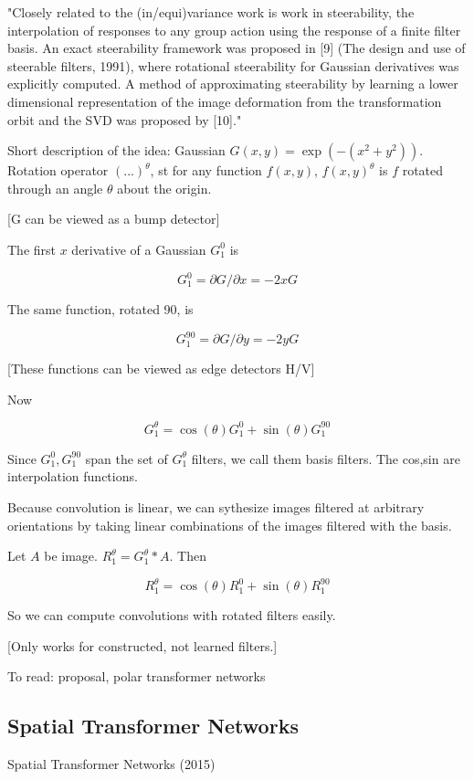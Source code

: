 \documentclass[english]{article}
\begin{document}
\item "Closely related to the (in/equi)variance work is work in steerability, the interpolation of responses to any
group action using the response of a finite filter basis. An exact steerability framework was proposed in [9] (The design and use of steerable filters, 1991),
where rotational steerability for Gaussian derivatives was explicitly computed. A method of approximating steerability by learning a lower dimensional representation of the image deformation from the transformation
orbit and the SVD was proposed by [10]."


Short description of the idea: Gaussian $G(x,y) = \exp(-(x^2+y^2))$. Rotation operator $(...)^\theta$, st for any function $f(x,y)$, $f(x,y)^\theta$ is $f$ rotated through an angle $\theta$ about the origin. 

[G can be viewed as a bump detector]

The first $x$ derivative of a Gaussian $G_1^0$ is 

$$G_1^0 = \partial G/\partial x = -2x G$$

The same function, rotated 90, is 

$$G_1^{90} = \partial G/\partial y = -2y G$$

[These functions can be viewed as edge detectors H/V]

Now 

$$G_1^{\theta} = \cos(\theta) G_1^0 + \sin(\theta) G_1^{90} $$

Since $G_1^0, G_1^{90}$ span the set of $G_1^{\theta}$ filters, we call them basis filters. The cos,sin are interpolation functions.

Because convolution is linear, we can sythesize images filtered at arbitrary orientations by taking linear combinations of the images filtered with the basis. 

Let $A$ be image. $R_1^{\theta} = G_1^{\theta}*A$. Then 

$$R_1^{\theta} = \cos(\theta) R_1^0 + \sin(\theta) R_1^{90} $$

So we can compute convolutions with rotated filters easily.

[Only works for constructed, not learned filters.]

\item To read: proposal, polar transformer networks
\eitem 

\subsection{Spatial Transformer Networks}
\benum
\item Spatial Transformer Networks  (2015)
\end{document}

